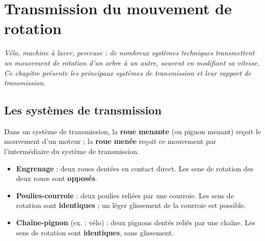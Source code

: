 \chapter{Transmission du mouvement de rotation}

\noindent\textit{Vélo, machine à laver, perceuse : de nombreux systèmes techniques
transmettent un mouvement de rotation d'un arbre à un autre, souvent en modifiant sa
vitesse. Ce chapitre présente les principaux systèmes de transmission et leur rapport de
transmission.}
\vspace{8pt}

\connecteBanner

\section{Les systèmes de transmission}

\begin{definition}
Dans un système de transmission, la \textbf{roue menante} (ou pignon menant) reçoit le
mouvement d'un moteur ; la \textbf{roue menée} reçoit ce mouvement par l'intermédiaire du
système de transmission.
\end{definition}

\begin{propriete}
\begin{itemize}
\item \textbf{Engrenage} : deux roues dentées en contact direct. Les sens de rotation des
deux roues sont \textbf{opposés}.
\item \textbf{Poulies-courroie} : deux poulies reliées par une courroie. Les sens de
rotation sont \textbf{identiques} ; un léger glissement de la courroie est possible.
\item \textbf{Chaîne-pignon} (ex. : vélo) : deux pignons dentés reliés par une chaîne. Les
sens de rotation sont \textbf{identiques}, sans glissement.
\end{itemize}
\end{propriete}

\begin{illus}
\end{illus}

